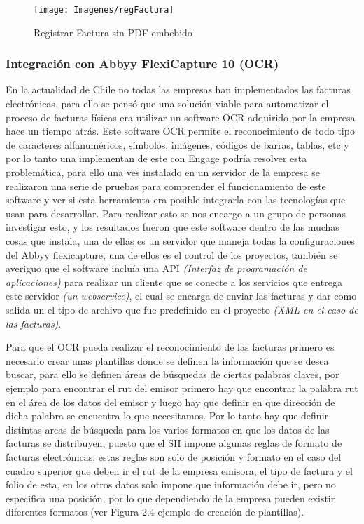 		\begin{figure}[H]
			\texttt{[image: Imagenes/regFactura]}
			\caption{Registrar Factura sin PDF embebido}
		\end{figure}	
		
		
		\subsubsection{Integración con Abbyy FlexiCapture 10 (OCR)}
		En la actualidad de Chile no todas las empresas han implementados las facturas electrónicas, para ello se pensó que una solución viable para automatizar el proceso de facturas físicas era utilizar un software OCR adquirido por la empresa hace un tiempo atrás. Este software OCR permite el reconocimiento de todo tipo de caracteres alfanuméricos, símbolos, imágenes, códigos de barras, tablas, etc y por lo tanto una implementan de este con Engage podría resolver esta problemática, para ello una ves instalado en un servidor de la empresa se realizaron una serie de pruebas para comprender el funcionamiento de este software y ver si esta herramienta era posible integrarla con las tecnologías que usan para desarrollar. Para realizar esto se nos encargo a un grupo de personas investigar esto, y los resultados fueron que este software dentro de las muchas cosas que instala, una de ellas es un servidor que maneja todas la configuraciones del Abbyy flexicapture, una de ellos es el control de los proyectos, también se averiguo que el software incluía una API \textit{(Interfaz de programación de aplicaciones)} para realizar un cliente que se conecte a los servicios que entrega este servidor \textit{(un webservice)}, el cual se encarga de enviar las facturas y dar como salida un el tipo de archivo que fue predefinido en el proyecto \textit{(XML en el caso de las facturas)}.
		\newline
		\par   
		Para que el OCR pueda realizar el reconocimiento de las facturas primero es necesario crear unas plantillas donde se definen la información que se desea buscar, para ello se definen áreas de búsquedas de ciertas palabras claves, por ejemplo para encontrar el rut del emisor primero hay que encontrar la palabra rut en el área de los datos del emisor y luego hay que definir en que dirección de dicha palabra se encuentra lo que necesitamos. Por lo tanto hay que definir distintas areas de búsqueda para los varios formatos en que los datos de las facturas se distribuyen, puesto que el SII impone algunas reglas de formato de facturas electrónicas, estas reglas son solo de posición y formato en el caso del cuadro superior que deben ir el rut de la empresa emisora, el tipo de factura y el folio de esta, en los otros datos solo impone que información debe ir, pero no especifica una posición, por lo que dependiendo de la empresa pueden existir diferentes formatos (ver Figura 2.4 ejemplo de creación de plantillas).
		
